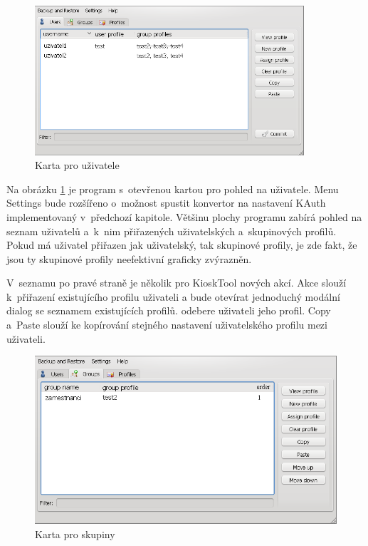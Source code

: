 \begin{figure}
\centering
\includegraphics[width=10cm]{obrazky/navrh-usersz.png}
\caption{Karta pro uživatele}
\label{fig:kt4_newusers}
\end{figure}

Na obrázku \ref{fig:kt4_newusers} je program s~otevřenou kartou pro pohled na uživatele. Menu Settings bude rozšířeno o~možnost spustit konvertor na nastavení KAuth implementovaný v~předchozí kapitole. Většinu plochy programu zabírá pohled na seznam uživatelů a~k~nim přiřazených uživatelských a~skupinových profilů. Pokud má uživatel přiřazen jak uživatelský, tak skupinové profily, je zde fakt, že jsou ty skupinové profily neefektivní graficky zvýrazněn.

V~seznamu po pravé straně je několik pro KioskTool nových akcí. Akce  slouží k~přiřazení existujícího profilu uživateli a bude otevírat jednoduchý modální dialog se seznamem existujících profilů.  odebere uživateli jeho profil. Copy a~Paste slouží ke kopírování stejného nastavení uživatelského profilu mezi uživateli.

\begin{figure}
\centering
\includegraphics[width=13cm]{obrazky/navrh-groupsz.png}
\caption{Karta pro skupiny}
\label{fig:kt4_newgroups}
\end{figure}

